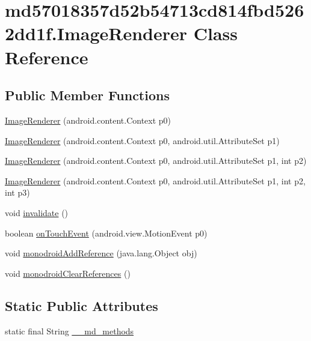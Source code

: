 \hypertarget{classmd57018357d52b54713cd814fbd5262dd1f_1_1_image_renderer}{
\section{md57018357d52b54713cd814fbd5262dd1f.ImageRenderer Class Reference}
\label{classmd57018357d52b54713cd814fbd5262dd1f_1_1_image_renderer}
}
\subsection*{Public Member Functions}
\begin{CompactItemize}
\item 
\hyperlink{classmd57018357d52b54713cd814fbd5262dd1f_1_1_image_renderer_75085da3c8269f5e0e8053ea9f2804a7}{ImageRenderer} (android.content.Context p0)
\item 
\hyperlink{classmd57018357d52b54713cd814fbd5262dd1f_1_1_image_renderer_0947c7c3bb9345bab25385a875725446}{ImageRenderer} (android.content.Context p0, android.util.AttributeSet p1)
\item 
\hyperlink{classmd57018357d52b54713cd814fbd5262dd1f_1_1_image_renderer_4cbfa52301eb9f06d519eac869c63a3a}{ImageRenderer} (android.content.Context p0, android.util.AttributeSet p1, int p2)
\item 
\hyperlink{classmd57018357d52b54713cd814fbd5262dd1f_1_1_image_renderer_a5715d5e475e6798cbd44a0ea396efcf}{ImageRenderer} (android.content.Context p0, android.util.AttributeSet p1, int p2, int p3)
\item 
void \hyperlink{classmd57018357d52b54713cd814fbd5262dd1f_1_1_image_renderer_037c35822acfdc7a7644cd23d45c4a00}{invalidate} ()
\item 
boolean \hyperlink{classmd57018357d52b54713cd814fbd5262dd1f_1_1_image_renderer_0138cd2d209b20e20429b8d025a44a6a}{onTouchEvent} (android.view.MotionEvent p0)
\item 
void \hyperlink{classmd57018357d52b54713cd814fbd5262dd1f_1_1_image_renderer_8a59b5b90d807e540c86a0c578f715f8}{monodroidAddReference} (java.lang.Object obj)
\item 
void \hyperlink{classmd57018357d52b54713cd814fbd5262dd1f_1_1_image_renderer_728618eb60ebbc2bb870cd135d007a76}{monodroidClearReferences} ()
\end{CompactItemize}
\subsection*{Static Public Attributes}
\begin{CompactItemize}
\item 
static final String \hyperlink{classmd57018357d52b54713cd814fbd5262dd1f_1_1_image_renderer_8e8d2f260d749e2e0e874ea565fa7dd1}{\_\-\_\-md\_\-methods}
\end{CompactItemize}
